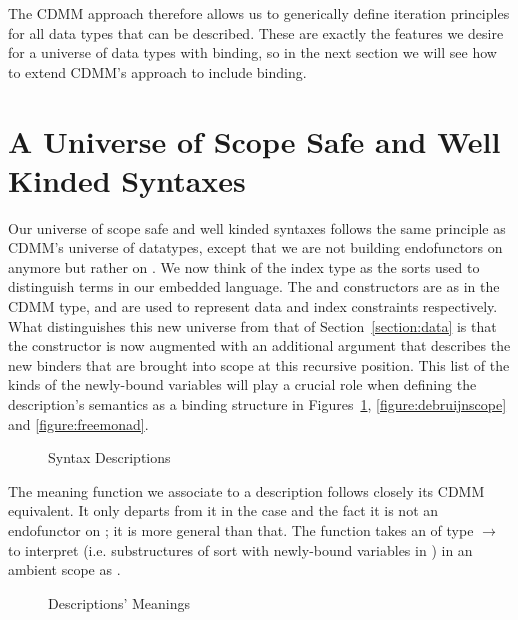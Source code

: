 The CDMM approach therefore allows us to generically define iteration principles
for all data types that can be described. These are exactly the features we desire
for a universe of data types with binding, so in the next section we will see how
to extend CDMM's approach to include binding.




\section{A Universe of Scope Safe and Well Kinded Syntaxes}\label{section:universe}

Our universe of scope safe and well kinded syntaxes follows the same principle
as CDMM's universe of datatypes, except that we are not building endofunctors on
 anymore but rather on { }. We now think of the index
type  as the sorts
used to distinguish terms in our embedded language. The  and
 constructors are as in the CDMM  type, and are used to
represent data and index constraints respectively. 
What distinguishes this new universe  from that of Section~\ref{section:data} 
is that the
 constructor
is now augmented with an additional { } argument that describes
the new binders that are brought into scope at this recursive position. This
list of the kinds of the newly-bound variables will play a crucial role when
defining the description's semantics as a binding structure in
Figures~\ref{figure:syntaxmeaning}, \ref{figure:debruijnscope} and \ref{figure:freemonad}.

\begin{figure}[h]
\caption{Syntax Descriptions}
\end{figure}

The meaning function  we associate to a description follows closely
its CDMM equivalent. It only departs from it in the  case and the fact
it is not an endofunctor on  ; it is more general than that.
The function takes an  of type {  $\rightarrow$  }
to interpret {  } (i.e. substructures of sort  with
newly-bound variables in ) in an ambient scope  as {   }.

\begin{figure}[h]
\caption{Descriptions' Meanings}\label{figure:syntaxmeaning}
\end{figure}

